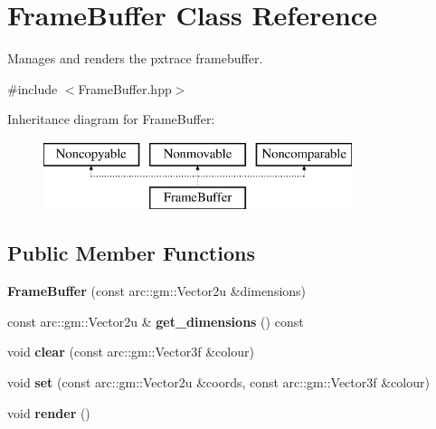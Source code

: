 \hypertarget{class_frame_buffer}{}\section{Frame\+Buffer Class Reference}
\label{class_frame_buffer}


Manages and renders the pxtrace framebuffer.  




{\ttfamily \#include $<$Frame\+Buffer.\+hpp$>$}

Inheritance diagram for Frame\+Buffer\+:\begin{figure}[H]
\begin{center}
\leavevmode
\includegraphics[height=2.000000cm]{class_frame_buffer}
\end{center}
\end{figure}
\subsection*{Public Member Functions}
\begin{DoxyCompactItemize}
\item 
{\bfseries Frame\+Buffer} (const arc\+::gm\+::\+Vector2u \&dimensions)\hypertarget{class_frame_buffer_a401bafe0883b04f8ad3646df6ab8c2f8}{}\label{class_frame_buffer_a401bafe0883b04f8ad3646df6ab8c2f8}

\item 
const arc\+::gm\+::\+Vector2u \& {\bfseries get\+\_\+dimensions} () const \hypertarget{class_frame_buffer_ac2d95d560c78b10f9d4fa6f451f7ae4f}{}\label{class_frame_buffer_ac2d95d560c78b10f9d4fa6f451f7ae4f}

\item 
void {\bfseries clear} (const arc\+::gm\+::\+Vector3f \&colour)\hypertarget{class_frame_buffer_ad483b674420912d9d83e96f9a5a69606}{}\label{class_frame_buffer_ad483b674420912d9d83e96f9a5a69606}

\item 
void {\bfseries set} (const arc\+::gm\+::\+Vector2u \&coords, const arc\+::gm\+::\+Vector3f \&colour)\hypertarget{class_frame_buffer_afef184689769b3c02bafe48925660820}{}\label{class_frame_buffer_afef184689769b3c02bafe48925660820}

\item 
void {\bfseries render} ()\hypertarget{class_frame_buffer_a10f86a6dc0649d660a17fc184a7dcc27}{}\label{class_frame_buffer_a10f86a6dc0649d660a17fc184a7dcc27}

\end{DoxyCompactItemize}


